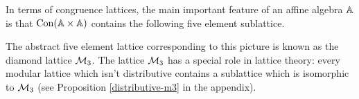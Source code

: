 \documentclass[letterpaper,11pt]{article}
\DeclareMathOperator{\Con}{Con}
\begin{document}
In terms of congruence lattices, the main important feature of an affine algebra $\mathbb{A}$ is that $\Con(\bA\times\bA)$ contains the following five element sublattice.%
\begin{center}
\end{center}
The abstract five element lattice corresponding to this picture is known as the diamond lattice $\mathcal{M}_3$. The lattice $\mathcal{M}_3$ has a special role in lattice theory: every modular lattice which isn't distributive contains a sublattice which is isomorphic to $\mathcal{M}_3$ (see Proposition \ref{distributive-m3} in the appendix).
\end{document}
